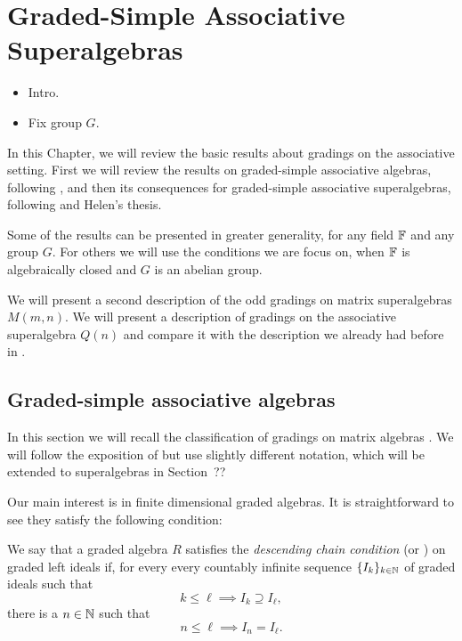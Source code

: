 \chapter*{Graded-Simple Associative Superalgebras}\label{chap:grd-simple-assc}

\begin{itemize}
    \item Intro.
    \item Fix group $G$.
\end{itemize}

In this Chapter, we will review the basic results about gradings on the associative setting.
First we will review the results on graded-simple associative algebras, following \cite{BK10}, and then its consequences for graded-simple associative superalgebras, following \cite{paper-MAP} and Helen's thesis. 

Some of the results can be presented in greater generality, for any field $\mathbb{F}$ and any group $G$. 
For others we will use the conditions we are focus on, when $\mathbb{F}$ is algebraically closed and $G$ is an abelian group.

We will present a second description of the odd gradings on matrix superalgebras $M(m,n)$. 
We will present a description of gradings on the associative superalgebra $Q(n)$ and compare it with the description we already had before in \cite{paper-Qn}.

\section{Graded-simple associative algebras}

In this section we will recall the classification of gradings on matrix algebras \cite{BSZ01, BZ02, BK10}. 
We will follow the exposition of \cite[Chapter 2]{livromicha} but use slightly different notation, which will be extended to superalgebras in Section~??%

Our main interest is in finite dimensional graded algebras. 
It is straightforward to see they satisfy the following condition:

\begin{defi}
    We say that a graded algebra $R$ satisfies the \emph{descending chain condition} (or \emph{\dcc}) on graded left ideals if, for every every countably infinite sequence $\{I_k\}_{k\in \mathbb{N}}$ of graded ideals such that \[k \leq \ell \implies I_k \supseteq I_\ell,\] there is a $n\in \mathbb{N}$ such that \[n \leq \ell \implies I_n = I_\ell.\]
\end{defi}

